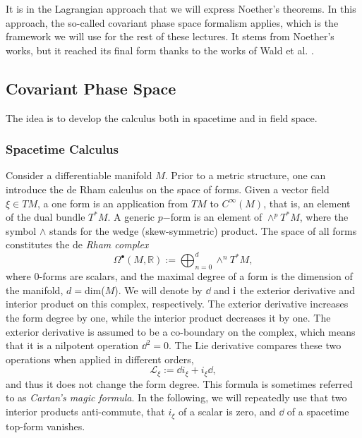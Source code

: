  It is in the Lagrangian approach that we will express Noether’s theorems. In this approach, the so-called covariant phase space formalism applies, which is the framework we will use for the rest of these lectures. It stems from Noether’s works, but it reached its final form thanks to the works of Wald et al. \cite{Lee:1990nz,Wald:1993nt,Iyer:1994ys,Iyer:1995kg,Wald:1999wa}.
 
 \subsection{Covariant Phase Space}
 The idea is to develop the calculus both in spacetime and in field space.
 
\subsubsection*{Spacetime Calculus} Consider a differentiable manifold $M$. Prior to a metric structure, one can introduce the de Rham calculus on the space of forms. Given a vector field $\xi\in TM$, a one form is an application from $TM$ to $C^\infty(M)$, that is, an element of the dual bundle $T^*M$. A generic $p$−form is an element of $\wedge^pT^*M$, where the symbol $\wedge$ stands for the wedge (skew-symmetric) product. The space of all forms constitutes the de \textit{Rham complex}
\begin{equation}
	\Omega^\bullet(M,\mathbb{R}):=\bigoplus_{n=0}^d\wedge^n T^*M,
\end{equation}
where $0$-forms are scalars, and the maximal degree of a form is the dimension of the manifold, $d =$dim($M$). We will denote by $\dd $ and $\mathrm{i}$ the exterior derivative and interior product on this complex, respectively. The exterior derivative increases the form degree by one, while the interior product decreases it by one. The exterior derivative is assumed to be a co-boundary on the complex, which means that it is a nilpotent operation $\dd^2=0$. The Lie derivative compares these two operations when applied in different orders,
\begin{equation}
	\mathcal{L}_\xi:=\dd i_\xi + i_\xi\dd ,
\end{equation}
and thus it does not change the form degree. This formula is sometimes referred to as \textit{Cartan’s magic formula}. In the following, we will repeatedly use that two interior products anti-commute, that $i_\xi $ of a scalar is zero, and $\dd $ of a spacetime top-form vanishes.

